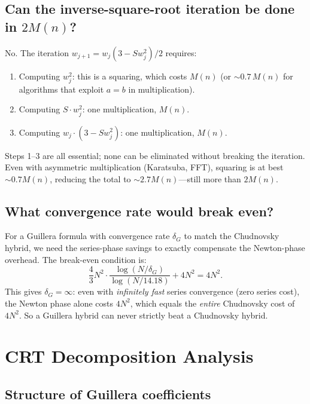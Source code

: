 \documentclass[11pt]{article}
\begin{document}
\subsection{Can the inverse-square-root iteration be done in $2M(n)$?}

No. The iteration $w_{j+1} = w_j(3 - Sw_j^2)/2$ requires:
\begin{enumerate}
\item Computing $w_j^2$: this is a squaring, which costs $M(n)$ (or $\sim 0.7\,M(n)$ for algorithms that exploit $a = b$ in multiplication).
\item Computing $S \cdot w_j^2$: one multiplication, $M(n)$.
\item Computing $w_j \cdot (3 - Sw_j^2)$: one multiplication, $M(n)$.
\end{enumerate}
Steps 1--3 are all essential; none can be eliminated without breaking the iteration. Even with asymmetric multiplication (Karatsuba, FFT), squaring is at best $\sim 0.7M(n)$, reducing the total to $\sim 2.7M(n)$---still more than $2M(n)$.

\subsection{What convergence rate would break even?}

For a Guillera formula with convergence rate $\delta_G$ to match the Chudnovsky hybrid, we need the series-phase savings to exactly compensate the Newton-phase overhead. The break-even condition is:
\[
\frac{4}{3}N^2 \cdot \frac{\log(N/\delta_G)}{\log(N/14.18)} + 4N^2 = 4N^2.
\]
This gives $\delta_G = \infty$: even with \emph{infinitely fast} series convergence (zero series cost), the Newton phase alone costs $4N^2$, which equals the \emph{entire} Chudnovsky cost of $4N^2$. So a Guillera hybrid can never strictly beat a Chudnovsky hybrid.

\section{CRT Decomposition Analysis}
\label{sec:crt}

\subsection{Structure of Guillera coefficients}
\end{document}
